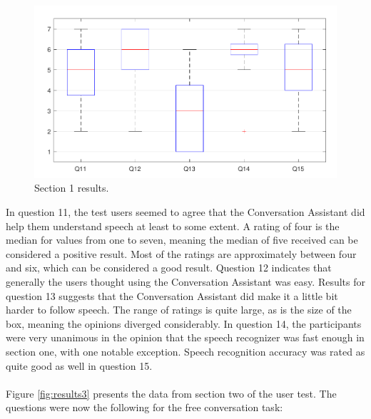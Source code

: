 \documentclass[english, 12pt, a4paper, pdftex, elec, utf8]{aaltothesis}
\begin{document}
\begin{figure}[h!]
    \centering
    \includegraphics[width=\textwidth]{T2_box2.pdf}
    \caption{Section 1 results.}
    \label{fig:results2}
\end{figure}
In question 11, the test users seemed to agree that the Conversation Assistant did help them understand speech at least to some extent. A rating of four is the median for values from one to seven, meaning the median of five received can be considered a positive result. Most of the ratings are approximately between four and six, which can be considered a good result. Question 12 indicates that generally the users thought using the Conversation Assistant was easy. Results for question 13 suggests that the Conversation Assistant did make it a little bit harder to follow speech. The range of ratings is quite large, as is the size of the box, meaning the opinions diverged considerably. In question 14, the participants were very unanimous in the opinion that the speech recognizer was fast enough in section one, with one notable exception. Speech recognition accuracy was rated as quite good as well in question 15. \\\\
Figure \ref{fig:results3} presents the data from section two of the user test. The questions were now the following for the free conversation task:
\end{document}
